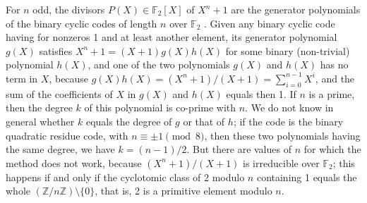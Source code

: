\documentclass{amsart}
\numberwithin{equation}{section}
\theoremstyle{definition}
\begin{document}
 For $n$ odd, the divisors $P(X)\in \mathbb F_2[X]$ of $X^n+1$ are the generator polynomials of the binary cyclic codes of length $n$ over $\mathbb{F}_2$ \cite{CC-Sloane}. %
Given any binary cyclic code having for nonzeros 1 and at least another element, its generator polynomial $g(X)$ satisfies $X^n+1=(X+1)g(X)h(X)$ for some binary (non-trivial) polynomial $h(X)$, and one of the two polynomials $g(X)$ and $h(X)$ has no term in $X$, because $g(X)h(X)=(X^n+1)/(X+1)=\sum_{i=0}^{n-1}X^i$, and the sum of the coefficients of $X$ in $g(X)$ and $h(X)$ equals then 1. If $n$ is a prime, then the degree $k$ of this polynomial is co-prime with $n$. We do not know in general whether $k$ equals the degree of $g$ or that of $h$; if the code is the binary quadratic residue code, with $n\equiv \pm 1\pmod 8$, then these two polynomials having the same degree, we have $k=(n-1)/2$. But  there are values of $n$ for which the method does not work, because $(X^n+1)/(X+1)$ is irreducible over $\mathbb{F}_2$; this happens if and only if the cyclotomic class of 2 modulo $n$ containing 1 equals the whole $(\mathbb{Z}/n\mathbb{Z})\setminus \{0\}$, that is, 2 is a primitive element modulo $n$. %
\end{document}
